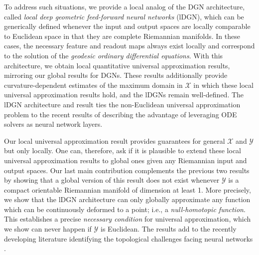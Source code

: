 \documentclass[anon,12pt]{colt2021} %
\newcommand{\xxx}{\mathcal{X}}
\newcommand{\yyy}{\mathcal{Y}}
\begin{document}
To address such situations, we provide a local analog of the DGN architecture, called \textit{local deep geometric feed-forward neural networks} (lDGN), which can be generically defined whenever the input and output spaces are locally comparable to Euclidean space in that they are complete Riemannian manifolds.  In these cases, the necessary feature and readout maps always exist locally and correspond to the solution of the \textit{geodesic ordinary differential equations}.  With this architecture, we obtain local quantitative universal approximation results, mirroring our global results for DGNs.  
These results additionally provide curvature-dependent estimates of the maximum domain in $\xxx$ in which these local universal approximation results hold, and the lDGNs remain well-defined.  %
The lDGN architecture and result ties the non-Euclidean universal approximation problem to the recent results of \cite{bai2019deep,herrera2020neural} describing the advantage of leveraging ODE solvers as neural network layers.  

Our local universal approximation result provides guarantees for general $\xxx$ and $\yyy$ but only locally.  One can, therefore, ask if it is plausible to extend these local universal approximation results to global ones given any Riemannian input and output spaces.  Our last main contribution complements the previous two results by showing that a global version of this result does not exist whenever $\yyy$ is a compact orientable Riemannian manifold of dimension at least 1.  More precisely, we show that the lDGN architecture can only globally approximate any function which can be continuously deformed to a point; i.e., a \textit{null-homotopic function}.  This establishes a precise \textit{necessary condition} for universal approximation, which we show can never happen if $\yyy$ is Euclidean.  The results add to the recently developing literature identifying the topological challenges facing neural networks \cite{NIPS2017_883e881b, petersen2018topological,barannikov2020topological}.  
\end{document}
